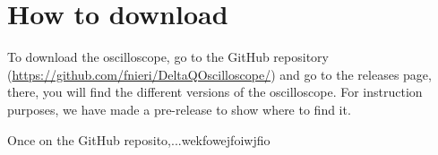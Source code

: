 \section{How to download}
    To download the oscilloscope, go to the GitHub repository (\url{https://github.com/fnieri/DeltaQOscilloscope/}) and go to the releases page, there, you will find the different versions of the oscilloscope. For instruction purposes, we have made a pre-release to show where to find it.

    Once on the  GitHub reposito,...wekfowejfoiwjfio
